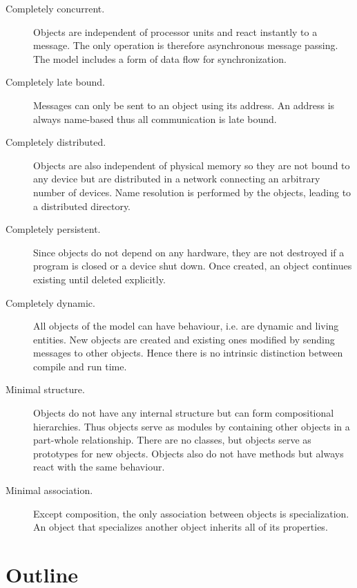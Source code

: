 \begin{description}
\item[Completely concurrent.] Objects are independent of processor units and react instantly to a message. The only operation is therefore asynchronous message passing. The model includes a form of data flow for synchronization.

\item[Completely late bound.] Messages can only be sent to an object using its address. An address is always name-based thus all communication is late bound.

\item[Completely distributed.] Objects are also independent of physical memory so they are not bound to any device but are distributed in a network connecting an arbitrary number of devices. Name resolution is performed by the objects, leading to a distributed directory.

\item[Completely persistent.] Since objects do not depend on any hardware, they are not destroyed if a program is closed or a device shut down. Once created, an object continues existing until deleted explicitly.

\item[Completely dynamic.] All objects of the model can have behaviour, i.e. are dynamic and living entities. New objects are created and existing ones modified by sending messages to other objects. Hence there is no intrinsic distinction between compile and run time.

\item[Minimal structure.] Objects do not have any internal structure but can form compositional hierarchies. Thus objects serve as modules by containing other objects in a part-whole relationship. There are no classes, but objects serve as prototypes for new objects. Objects also do not have methods but always react with the same behaviour.

\item[Minimal association.] Except composition, the only association between objects is specialization. An object that specializes another object inherits all of its properties.

\end{description}

\section{Outline}

